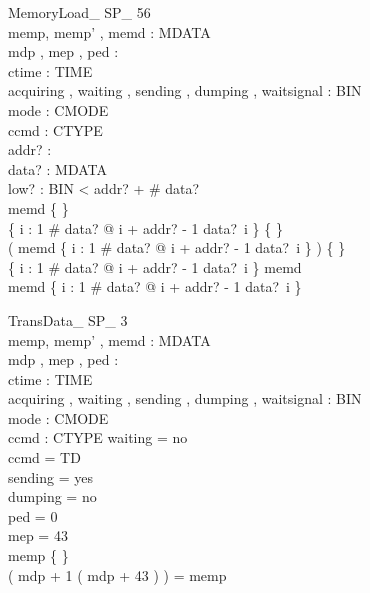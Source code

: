 \begin{schema}{MemoryLoad\_ SP\_ 56}\\
 memp, memp' , memd : \seq MDATA \\
 mdp , mep , ped : \nat \\
 ctime : TIME \\
 acquiring , waiting , sending , dumping , waitsignal : BIN \\
 mode : CMODE \\
 ccmd : CTYPE \\
 addr? : \nat \\
 data? : \seq MDATA \\
 low? : BIN 
 < addr? + \# data? \\
 memd \neq \{ \} \\
 \{ i : 1 \upto \# data? @ i + addr? - 1 \mapsto data?~i \} \neq \{ \} \\
 ( \dom memd \cap \dom \{ i : 1 \upto \# data? @ i + addr? - 1 \mapsto data?~i \} ) \neq \{ \} \\
 \lnot \dom \{ i : 1 \upto \# data? @ i + addr? - 1 \mapsto data?~i \} \subseteq \dom memd \\
 \lnot \dom memd \subseteq \dom \{ i : 1 \upto \# data? @ i + addr? - 1 \mapsto data?~i \}
\end{schema}

\begin{schema}{TransData\_ SP\_ 3}\\
 memp, memp' , memd : \seq MDATA \\
 mdp , mep , ped : \nat \\
 ctime : TIME \\
 acquiring , waiting , sending , dumping , waitsignal : BIN \\
 mode : CMODE \\
 ccmd : CTYPE 
\where
 waiting = no \\
 ccmd = TD \\
 sending = yes \\
 dumping = no \\
 ped = 0 \\
 mep = 43 \\
 memp \neq \{ \} \\
 ( mdp + 1 \upto ( mdp + 43 ) ) = \dom memp
\end{schema}


